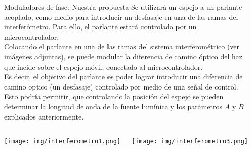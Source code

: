 \documentclass[mathserif]{beamer} %
\begin{document}
\begin{frame}
\begin{columns}[T]
\begin{column}{.475\linewidth}
              \end{column}

              \begin{column}{.475\linewidth}
                \vspace{-2ex}
	\begin{block}{Moduladores de fase: Nuestra propuesta}  
               \justifying
               Se utilizará un espejo a un parlante acoplado, como medio para introducir un desfasaje en una de las ramas del interferómetro. Para ello, el parlante estará controlado por un microcontrolador.\\
                  Colocando el parlante en una de las ramas del sistema interferométrico (ver imágenes adjuntas), se puede modular la diferencia de camino óptico del haz que incide sobre el espejo móvil, conectado al microcontrolador. \\
Es decir, el objetivo del parlante es poder lograr introducir una diferencia de camino optico (un desfasaje) controlado por medio de una señal de control. Esto podría permitir, que controlando la posición del espejo se pueden determinar la longitud de onda de la fuente lumínica y los parámetros $A$ y $B$ explicados anteriormente.

                  \vspace{1ex}

                  \begin{columns}
                    \begin{column}{.33\linewidth}
                      \begin{center}
                        \texttt{[image: img/interferometro1.png]}
                      \end{center}
                    \end{column} 
                    \begin{column}{.33\linewidth}
                      \begin{center}
                        \texttt{[image: img/interferometro3.png]}
                      \end{center}
                    \end{column}
            

\end{columns}
\end{block}
\end{column}
\end{columns}
\end{frame}
\end{document}
